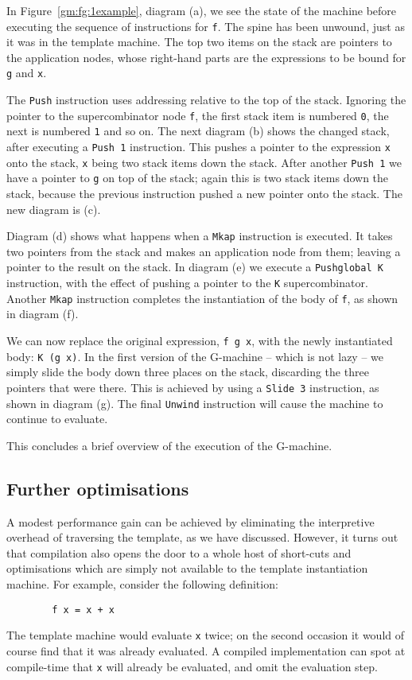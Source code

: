 In Figure~\ref{gm:fg:1example}, diagram (a), we see the state
of the machine before executing the sequence of instructions for \mbox{\tt f}.
The spine has been unwound, just as it was in the template machine.
The top two items on the stack are pointers to the application nodes,
whose right-hand parts are the expressions to be bound for \mbox{\tt g} and
\mbox{\tt x}.

The \mbox{\tt Push} instruction uses addressing relative to the top of the
stack. Ignoring the pointer to the supercombinator node \mbox{\tt f}, the first
stack item is numbered \mbox{\tt 0}, the next is numbered \mbox{\tt 1} and so on. The
next diagram (b) shows the changed stack, after executing a \mbox{\tt Push\ 1}
instruction.  This pushes a pointer to the expression \mbox{\tt x} onto the
stack, \mbox{\tt x} being two stack items down the stack. After another \mbox{\tt Push\ 1}
we have a pointer to \mbox{\tt g} on top of the stack; again this is two
stack items down the stack, because the previous instruction pushed a
new pointer onto the stack.  The new diagram is (c).

Diagram (d) shows what happens when a \mbox{\tt Mkap} instruction is
executed.  It takes two pointers from the stack and makes an
application node from them; leaving a pointer to the result on the
stack. In diagram (e) we execute a \mbox{\tt Pushglobal\ K} instruction,
with the effect of pushing a pointer to the \mbox{\tt K} supercombinator.
Another \mbox{\tt Mkap} instruction completes the instantiation of the body of
\mbox{\tt f}, as shown in diagram (f).

We can now replace the original expression, \mbox{\tt f\ g\ x}, with the newly
instantiated body: \mbox{\tt K\ (g\ x)}. In the first version of the G-machine
-- which is not lazy -- we simply slide the body down three places on the
stack, discarding the three pointers that were there. This is achieved
by using a \mbox{\tt Slide\ 3} instruction, as shown in diagram (g). The final
\mbox{\tt Unwind} instruction
will cause the machine to continue to evaluate.

This concludes a brief overview of the execution of the G-machine.

\subsection{Further optimisations}

A modest performance gain can be achieved by eliminating the
interpretive overhead of traversing the template, as we have discussed.  However, it turns
out that compilation also opens the door to a whole host of short-cuts
and optimisations which are simply not available to the
template instantiation machine. For example, consider the following
definition:
\begin{verbatim}
        f x = x + x
\end{verbatim}
The template machine would evaluate \mbox{\tt x} twice; on the second occasion
it would of course find that it was already evaluated.  A compiled
implementation can spot at compile-time that \mbox{\tt x} will already be
evaluated, and omit the evaluation step.

